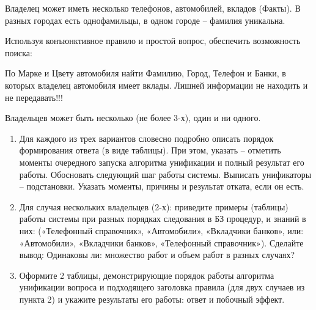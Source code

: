 \documentclass[12pt]{report}
\begin{document}
Владелец может иметь несколько телефонов, автомобилей, вкладов (Факты). В разных городах есть однофамильцы, в одном городе – фамилия уникальна.

Используя конъюнктивное правило и простой вопрос, обеспечить возможность поиска:

По Марке и Цвету автомобиля найти Фамилию, Город, Телефон и Банки, в которых владелец автомобиля имеет вклады. Лишней информации не находить и не передавать!!!

Владельцев может быть несколько (не более 3-х), один и ни одного.

\begin{enumerate}
	\item Для каждого из трех вариантов словесно подробно описать порядок формирования ответа (в виде таблицы). При этом, указать – отметить моменты очередного запуска алгоритма унификации и полный результат его работы. Обосновать следующий шаг работы системы. Выписать унификаторы – подстановки. Указать моменты, причины и результат отката, если он есть.
	\item Для случая нескольких владельцев (2-х): 
	приведите примеры (таблицы) работы системы при разных порядках следования в БЗ  процедур, и знаний в них: («Телефонный справочник», «Автомобили», «Вкладчики банков», или: «Автомобили», «Вкладчики банков», «Телефонный справочник»). Сделайте вывод: Одинаковы ли: множество работ и объем работ в разных случаях?
	\item Оформите 2 таблицы, демонстрирующие порядок работы алгоритма унификации вопроса и подходящего заголовка правила (для двух случаев из пункта 2) и укажите результаты его работы: ответ и побочный эффект.
\end{enumerate}

\newpage
\end{document}
